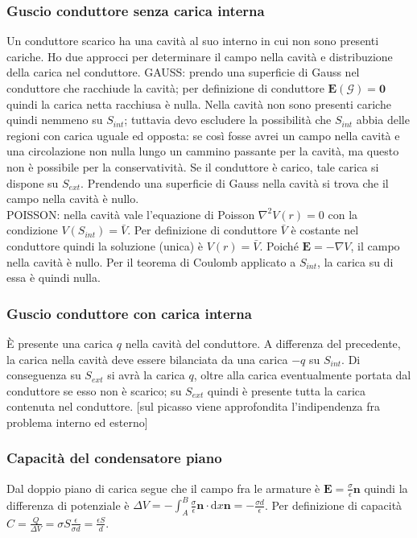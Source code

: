 \documentclass[11pt,a4paper]{article}
\newcommand{\de}{\mathrm d}
\begin{document}
\subsubsection{Guscio conduttore senza carica interna}
Un conduttore scarico ha una cavità al suo interno in cui non sono presenti cariche. Ho due approcci per determinare il campo nella cavità e distribuzione della carica nel conduttore.
GAUSS: prendo una superficie di Gauss nel conduttore che racchiude la cavità; per definizione di conduttore $\mathbf E(\mathcal G)=\mathbf 0$ quindi la carica netta racchiusa è nulla. Nella cavità non sono presenti cariche quindi nemmeno su $S_{int}$; tuttavia devo escludere la possibilità che $S_{int}$ abbia delle regioni con carica uguale ed opposta: se così fosse avrei un campo nella cavità e una circolazione non nulla lungo un cammino passante per la cavità, ma questo non è possibile per la conservatività. Se il conduttore è carico, tale carica si dispone su $S_{ext}$. Prendendo una superficie di Gauss nella cavità si trova che il campo nella cavità è nullo.\\
POISSON: nella cavità vale l'equazione di Poisson $\nabla^2 V(r) = 0$ con la condizione $V(S_{int}) = \bar V$. Per definizione di conduttore $\bar V$ è costante nel conduttore quindi la soluzione (unica) è $V(r)=\bar V$. Poiché $\mathbf E = -\nabla V$, il campo nella cavità è nullo. Per il teorema di Coulomb applicato a $S_{int}$, la carica su di essa è quindi nulla.

\subsubsection{Guscio conduttore con carica interna}
È presente una carica $q$ nella cavità del conduttore. A differenza del precedente, la carica nella cavità deve essere bilanciata da una carica $-q$ su $S_{int}$. Di conseguenza su $S_{ext}$ si avrà la carica $q$, oltre alla carica eventualmente portata dal conduttore se esso non è scarico; su $S_{ext}$ quindi è presente tutta la carica contenuta nel conduttore. [sul picasso viene approfondita l'indipendenza fra problema interno ed esterno]

\subsubsection{Capacità del condensatore piano}
Dal doppio piano di carica segue che il campo fra le armature è $\mathbf E = \frac\sigma\epsilon \mathbf n$ quindi la differenza di potenziale è $\Delta V = -\int_A^B \frac\sigma\epsilon \mathbf n \cdot \de x \mathbf n = -\frac{\sigma d}\epsilon$. Per definizione di capacità $C=\frac{Q}{\Delta V} = \sigma S \frac{\epsilon}{\sigma d} = \frac{\epsilon S}d$.
\end{document}
